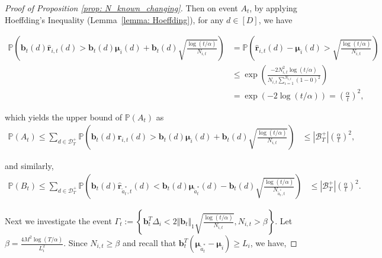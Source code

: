 \begin{proof}[Proof of Proposition \ref{prop: N_known_changing}]
Then on event $A_t$, by applying Hoeffding’s Inequality (Lemma~\ref{lemma: Hoeffding}), for any $d \in [D]$, we have

\begin{equation}
\begin{aligned}
\mathbb{P} \left( \boldsymbol{b}_{t}(d) \hat{\boldsymbol{r}}_{i,t}(d) > \boldsymbol{b}_{t}(d) \boldsymbol{\mu}_{i}(d) + \boldsymbol{b}_{t}(d) \sqrt{\frac{ \log(t/\alpha)}{N_{i,t}}}\right) 
& = 
\mathbb{P} \left( \hat{\boldsymbol{r}}_{i,t}(d) - \boldsymbol{\mu}_{i}(d) > \sqrt{\frac{ \log(t/\alpha)}{N_{i,t}}} \right) \\
& \leq
\exp \left( \frac{-2 N_{i,t}^2 \log(t/\alpha) }{ N_{i,t} \sum_{\iota=1}^{N_{i,t}}(1-0)^2 } \right) \\
& =
\exp \left( -2 \log(t/\alpha) \right) 
=
\left( \frac{\alpha}{t} \right)^2,
\end{aligned}
\end{equation}

which yields the upper bound of $\mathbb{P} (A_t)$ as 
\begin{equation}
\begin{aligned}
\label{eq: P_A_t_stat}
\mathbb{P} (A_t) \leq \sum_{d \in \mathcal{D}^{+}_{T}}
\mathbb{P} \left( \boldsymbol{b}_{t}(d) \hat{\boldsymbol{r}}_{i,t}(d) > \boldsymbol{b}_{t}(d) \boldsymbol{\mu}_{i}(d) + \boldsymbol{b}_{t}(d) \sqrt{\frac{ \log(t/\alpha)}{N_{i,t}}}\right) 
& \leq 
|\mathcal{B}^{+}_{T}| \left( \frac{\alpha}{t} \right)^2,
\end{aligned}
\end{equation}

and similarly,
\begin{equation}
\begin{aligned}
\label{eq: P_B_t_stat}
\mathbb{P} (B_t) \leq \sum_{d \in \mathcal{D}^{+}_{T}}
\mathbb{P} \left( \boldsymbol{b}_{t}(d) \hat{\boldsymbol{r}}_{\tilde{a}_{t}^{*},t}(d) < \boldsymbol{b}_{t}(d) \boldsymbol{\mu}_{\tilde{a}_{t}^{*}}(d) - \boldsymbol{b}_{t}(d) \sqrt{\frac{ \log(t/\alpha)}{N_{\tilde{a}_{t}^{*},t}}} \right) 
& \leq 
|\mathcal{B}^{+}_{T}| \left( \frac{\alpha}{t} \right)^2.
\end{aligned}
\end{equation}

Next we investigate the event $\Gamma_t := \left\{ \boldsymbol{b}_{t}^{T} \Delta_i < 2 \Vert \boldsymbol{b}_{t} \Vert_1 \sqrt{\frac{ \log(t/\alpha)}{N_{i,t}}}, N_{i,t} > \beta \right\}$. 
Let $\beta = \frac{4 M^2 \log (T/\alpha)}{L_i^2}$. Since $N_{i,t} \geq \beta$ and recall that $\boldsymbol{b}_t^T (\boldsymbol{\mu}_{\tilde{a}^{*}_{t}} - \boldsymbol{\mu}_{i}) \geq L_i$, we have,


\end{proof}
